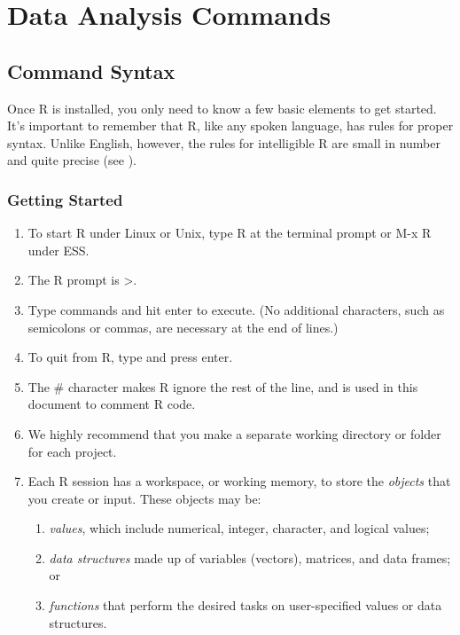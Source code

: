 \documentclass[letterpaper,10pt,english]{sphinxmanual}
\begin{document}
\chapter{Data Analysis Commands}
\label{3_data_analysis:data-analysis-commands}\label{3_data_analysis::doc}

\section{Command Syntax}
\label{3_data_analysis:command-syntax}
Once R is installed, you only need to know a few basic elements to get
started. It’s important to remember that R, like any spoken language,
has rules for proper syntax. Unlike English, however, the rules for
intelligible R are small in number and quite precise (see ).


\subsection{Getting Started}
\label{3_data_analysis:getting-started}\begin{enumerate}
\item {} 
To start R under Linux or Unix, type R at the terminal prompt or M-x
R under ESS.

\item {} 
The R prompt is \textgreater{}.

\item {} 
Type commands and hit enter to execute. (No additional characters,
such as semicolons or commas, are necessary at the end of lines.)

\item {} 
To quit from R, type  and press enter.

\item {} 
The \# character makes R ignore the rest of the line, and is used in
this document to comment R code.

\item {} 
We highly recommend that you make a separate working directory or
folder for each project.

\item {} 
Each R session has a workspace, or working memory, to store the
\emph{objects} that you create or input. These objects may be:
\begin{enumerate}
\item {} 
\emph{values}, which include numerical, integer, character, and logical
values;

\item {} 
\emph{data structures} made up of variables (vectors), matrices, and
data frames; or

\item {} 
\emph{functions} that perform the desired tasks on user-specified
values or data structures.

\end{enumerate}

\end{enumerate}
\end{document}
